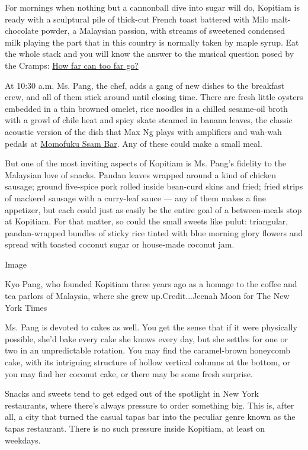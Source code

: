 For mornings when nothing but a cannonball dive into sugar will do,
Kopitiam is ready with a sculptural pile of thick-cut French toast
battered with Milo malt-chocolate powder, a Malaysian passion, with
streams of sweetened condensed milk playing the part that in this
country is normally taken by maple syrup. Eat the whole stack and you
will know the answer to the musical question posed by the Cramps:
\href{https://www.youtube.com/watch?v=c-S9pPFkfLY}{How far can too far
go?}

At 10:30 a.m. Ms. Pang, the chef, adds a gang of new dishes to the
breakfast crew, and all of them stick around until closing time. There
are fresh little oysters embedded in a thin browned omelet, rice noodles
in a chilled sesame-oil broth with a growl of chile heat and spicy skate
steamed in banana leaves, the classic acoustic version of the dish that
Max Ng plays with amplifiers and wah-wah pedals at
\href{https://www.nytimes3xbfgragh.onion/2017/10/31/dining/momofuku-ssam-bar-review.html}{Momofuku
Ssam Bar}. Any of these could make a small meal.

But one of the most inviting aspects of Kopitiam is Ms. Pang's fidelity
to the Malaysian love of snacks. Pandan leaves wrapped around a kind of
chicken sausage; ground five-spice pork rolled inside bean-curd skins
and fried; fried strips of mackerel sausage with a curry-leaf sauce ---
any of them makes a fine appetizer, but each could just as easily be the
entire goal of a between-meals stop at Kopitiam. For that matter, so
could the small sweets like pulut: triangular, pandan-wrapped bundles of
sticky rice tinted with blue morning glory flowers and spread with
toasted coconut sugar or house-made coconut jam.

Image

Kyo Pang, who founded Kopitiam three years ago as a homage to the coffee
and tea parlors of Malaysia, where she grew up.Credit...Jeenah Moon for
The New York Times

Ms. Pang is devoted to cakes as well. You get the sense that if it were
physically possible, she'd bake every cake she knows every day, but she
settles for one or two in an unpredictable rotation. You may find the
caramel-brown honeycomb cake, with its intriguing structure of hollow
vertical columns at the bottom, or you may find her coconut cake, or
there may be some fresh surprise.

Snacks and sweets tend to get edged out of the spotlight in New York
restaurants, where there's always pressure to order something big. This
is, after all, a city that turned the casual tapas bar into the peculiar
genre known as the tapas restaurant. There is no such pressure inside
Kopitiam, at least on weekdays.

